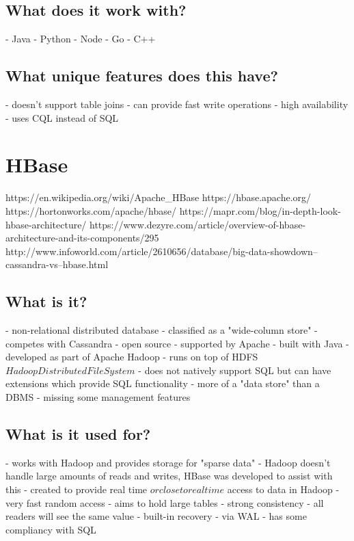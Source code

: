 \section{What does it work with?}
- Java
- Python
- Node
- Go
- C++

\section{What unique features does this have?}
- doesn't support table joins
- can provide fast write operations
- high availability
- uses CQL instead of SQL

\chapter{HBase}
https://en.wikipedia.org/wiki/Apache_HBase
https://hbase.apache.org/
https://hortonworks.com/apache/hbase/
https://mapr.com/blog/in-depth-look-hbase-architecture/
https://www.dezyre.com/article/overview-of-hbase-architecture-and-its-components/295
http://www.infoworld.com/article/2610656/database/big-data-showdown--cassandra-vs--hbase.html

\section{What is it?}
- non-relational distributed database - classified as a "wide-column store" - competes with Cassandra
- open source
- supported by Apache
- built with Java
- developed as part of Apache Hadoop - runs on top of HDFS \(Hadoop Distributed File System\)
- does not natively support SQL but can have extensions which provide SQL functionality
- more of a "data store" than a DBMS - missing some management features

\section{What is it used for?}
- works with Hadoop and provides storage for "sparse data"
- Hadoop doesn't handle large amounts of reads and writes, HBase was developed to assist with this
- created to provide real time \(or close to real time\) access to data in Hadoop - very fast random access
- aims to hold large tables
- strong consistency - all readers will see the same value
- built-in recovery - via WAL
- has some compliancy with SQL


